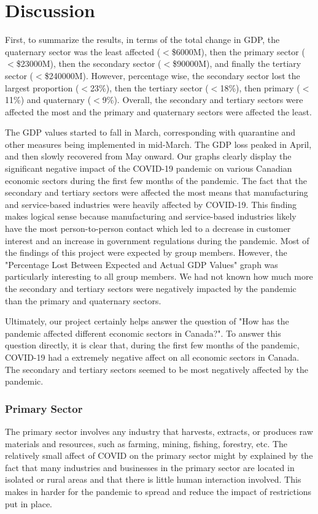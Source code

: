 \documentclass[fontsize=11pt]{article}
\begin{document}
\section*{Discussion}

First, to summarize the results, in terms of the total change in GDP, the quaternary sector was the least affected ($<$\$6000M), then the primary sector ($<$\$23000M), then the secondary sector ($<$\$90000M), and finally the tertiary sector ($<$\$240000M). However, percentage wise, the secondary sector lost the largest proportion ($<$23\%), then the tertiary sector ($<$18\%), then primary ($<$11\%) and quaternary ($<$9\%). Overall, the secondary and tertiary sectors were affected the most and the primary and quaternary sectors were affected the least.

The GDP values started to fall in March, corresponding with quarantine and other measures being implemented in mid-March. The GDP loss peaked in April, and then slowly recovered from May onward. Our graphs clearly display the significant negative impact of the COVID-19 pandemic on various Canadian economic sectors during the first few months of the pandemic. The fact that the secondary and tertiary sectors were affected the most means that manufacturing and service-based industries were heavily affected by COVID-19. This finding makes logical sense because manufacturing and service-based industries likely have the most person-to-person contact which led to a decrease in customer interest and an increase in government regulations during the pandemic. Most of the findings of this project were expected by group members. However, the "Percentage Lost Between Expected and Actual GDP Values" graph was particularly interesting to all group members. We had not known how much more the secondary and tertiary sectors were negatively impacted by the pandemic than the primary and quaternary sectors.

Ultimately, our project certainly helps answer the question of "How has the pandemic affected different economic sectors in Canada?". To answer this question directly, it is clear that, during the first few months of the pandemic, COVID-19 had a extremely negative affect on all economic sectors in Canada. The secondary and tertiary sectors seemed to be most negatively affected by the pandemic. 

\subsubsection*{Primary Sector}
The primary sector involves any industry that harvests, extracts, or produces raw materials and resources, such as farming, mining, fishing, forestry, etc. 
The relatively small affect of COVID on the primary sector might by explained by the fact that many industries and businesses in the primary sector are located in isolated or rural areas and that there is little human interaction involved. This makes in harder for the pandemic to spread and reduce the impact of restrictions put in place.
\end{document}
